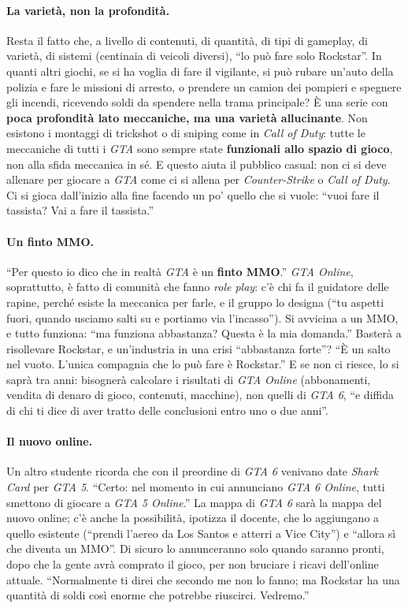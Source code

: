 \paragraph{La varietà, non la profondità.} Resta il fatto che, a livello di
contenuti, di quantità, di tipi di gameplay, di varietà, di sistemi (centinaia di
veicoli diversi), ``lo può fare solo Rockstar''. In quanti altri giochi, se si ha
voglia di fare il vigilante, si può rubare un'auto della polizia e fare le missioni
di arresto, o prendere un camion dei pompieri e spegnere gli incendi, ricevendo
soldi da spendere nella trama principale? È una serie con \textbf{poca profondità
lato meccaniche, ma una varietà allucinante}. Non esistono i montaggi di trickshot
o di sniping come in \emph{Call of Duty}: tutte le meccaniche di tutti i \emph{GTA}
sono sempre state \textbf{funzionali allo spazio di gioco}, non alla sfida meccanica
in sé. E questo aiuta il pubblico casual: non ci si deve allenare per giocare a
\emph{GTA} come ci si allena per \emph{Counter-Strike} o \emph{Call of Duty}. Ci si
gioca dall'inizio alla fine facendo un po' quello che si vuole: ``vuoi fare il
tassista? Vai a fare il tassista.''

\paragraph{Un finto MMO.} ``Per questo io dico che in realtà \emph{GTA} è un
\textbf{finto MMO}.'' \emph{GTA Online}, soprattutto, è fatto di comunità che fanno
\emph{role play}: c'è chi fa il guidatore delle rapine, perché esiste la meccanica
per farle, e il gruppo lo designa (``tu aspetti fuori, quando usciamo salti su e
portiamo via l'incasso''). Si avvicina a un MMO, e tutto funziona: ``ma funziona
abbastanza? Questa è la mia domanda.'' Basterà a risollevare Rockstar, e
un'industria in una crisi ``abbastanza forte''? ``È un salto nel vuoto. L'unica
compagnia che lo può fare è Rockstar.'' E se non ci riesce, lo si saprà tra anni:
bisognerà calcolare i risultati di \emph{GTA Online} (abbonamenti, vendita di
denaro di gioco, contenuti, macchine), non quelli di \emph{GTA 6}, ``e diffida di chi
ti dice di aver tratto delle conclusioni entro uno o due anni''.

\paragraph{Il nuovo online.} Un altro studente ricorda che con il preordine di
\emph{GTA 6} venivano date \emph{Shark Card} per \emph{GTA 5}. ``Certo: nel momento
in cui annunciano \emph{GTA 6 Online}, tutti smettono di giocare a \emph{GTA 5
Online}.'' La mappa di \emph{GTA 6} sarà la mappa del nuovo online; c'è anche la
possibilità, ipotizza il docente, che lo aggiungano a quello esistente (``prendi
l'aereo da Los Santos e atterri a Vice City'') e ``allora sì che diventa un MMO''.
Di sicuro lo annunceranno solo quando saranno pronti, dopo che la gente avrà
comprato il gioco, per non bruciare i ricavi dell'online attuale. ``Normalmente ti
direi che secondo me non lo fanno; ma Rockstar ha una quantità di soldi così
enorme che potrebbe riuscirci. Vedremo.''

